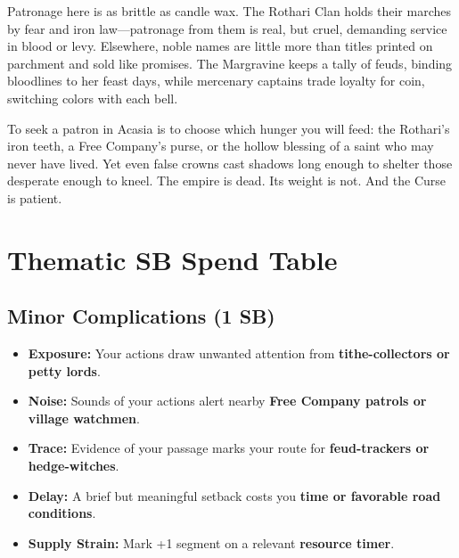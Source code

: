 \begin{tcolorbox}[colback=black!3,colframe=black!40!white,title={Decline \& Patronage},breakable]
Patronage here is as brittle as candle wax. The Rothari Clan holds their marches by fear and iron law---patronage from them is real, but cruel, demanding service in blood or levy. Elsewhere, noble names are little more than titles printed on parchment and sold like promises. The Margravine keeps a tally of feuds, binding bloodlines to her feast days, while mercenary captains trade loyalty for coin, switching colors with each bell.

To seek a patron in Acasia is to choose which hunger you will feed: the Rothari's iron teeth, a Free Company's purse, or the hollow blessing of a saint who may never have lived. Yet even false crowns cast shadows long enough to shelter those desperate enough to kneel. The empire is dead. Its weight is not. And the Curse is patient.
\end{tcolorbox}

\section*{Thematic SB Spend Table}
\label{sec:acasia-sb}

\subsection*{Minor Complications (1 SB)}
\begin{itemize}
\item \textbf{Exposure:} Your actions draw unwanted attention from \textbf{tithe-collectors or petty lords}.
\item \textbf{Noise:} Sounds of your actions alert nearby \textbf{Free Company patrols or village watchmen}.
\item \textbf{Trace:} Evidence of your passage marks your route for \textbf{feud-trackers or hedge-witches}.
\item \textbf{Delay:} A brief but meaningful setback costs you \textbf{time or favorable road conditions}.
\item \textbf{Supply Strain:} Mark +1 segment on a relevant \textbf{resource timer}.
\end{itemize}

